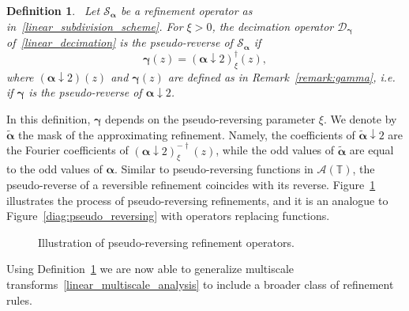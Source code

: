 \documentclass[12pt]{article}
\newtheorem{defin}{Definition}[section]
\begin{document}
\begin{defin}~\label{defin:pseudo-reversing_operators}
    Let $\mathcal{S}_{\boldsymbol{\alpha}}$ be a refinement operator as in~\eqref{linear_subdivision_scheme}. For $\xi>0$, the decimation operator $\mathcal{D}_{\boldsymbol{\gamma}}$ of~\eqref{linear_decimation} is the pseudo-reverse of $\mathcal{S}_{\boldsymbol{\alpha}}$ if
    \begin{equation*}
        \boldsymbol{\gamma}(z)=(\boldsymbol{\alpha}\downarrow 2)^\dagger_\xi(z),
    \end{equation*}
    where $(\boldsymbol{\alpha}\downarrow2)(z)$ and $\boldsymbol{\gamma}(z)$ are defined as in Remark~\ref{remark:gamma}, i.e. if $\boldsymbol{\gamma}$ is the pseudo-reverse of $\boldsymbol{\alpha}\downarrow 2$.
\end{defin}

In this definition, $\boldsymbol{\gamma}$ depends on the pseudo-reversing parameter $\xi$. We denote by $\widetilde{\boldsymbol{\alpha}}$ the mask of the approximating refinement. Namely, the coefficients of $\widetilde{\boldsymbol{\alpha}}\downarrow2$ are the Fourier coefficients of $(\boldsymbol{\alpha}\downarrow 2)^{-\dagger}_\xi(z)$, while the odd values of $\widetilde{\boldsymbol{\alpha}}$ are equal to the odd values of $\boldsymbol{\alpha}$. Similar to pseudo-reversing functions in $\mathcal{A}(\mathbb{T})$, the pseudo-reverse of a reversible refinement coincides with its reverse. Figure~\ref{diag:pseudo_reversing_operators} illustrates the process of pseudo-reversing refinements, and it is an analogue to Figure~\ref{diag:pseudo_reversing} with operators replacing functions.

\begin{figure}[H]
\centering
 \caption{Illustration of pseudo-reversing refinement operators.}
 \label{diag:pseudo_reversing_operators}
\end{figure}

Using Definition~\ref{defin:pseudo-reversing_operators} we are now able to generalize multiscale transforms~\eqref{linear_multiscale_analysis} to include a broader class of refinement rules. 
\end{document}
